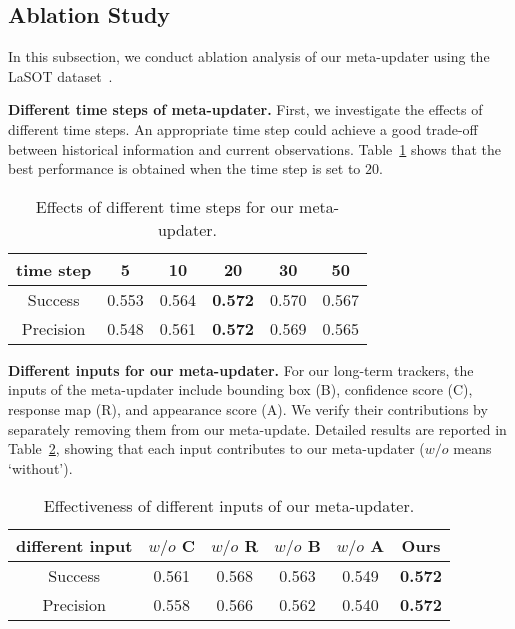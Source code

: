 \documentclass[10pt,twocolumn,letterpaper]{article}
\begin{document}
\subsection{Ablation Study}
\vspace{-2mm}
In this subsection, we conduct ablation analysis of our meta-updater
using the LaSOT dataset~\cite{LaSOT}.

\noindent \textbf{Different time steps of meta-updater.}
First, we investigate the effects of different time steps.
An appropriate time step could achieve a good trade-off between historical information and
current observations.
Table~\ref{tab:dts} shows that the best performance is obtained when the time step is set to
$20$.

\vspace{-3mm}
\begin{table}[h]
\caption{Effects of different time steps for our meta-updater.}
\vspace{-3mm}
\label{tab:dts}
\small
\begin{center}
\begin{tabular}{cccccc}
\hline
time step  & 5     & 10    & 20   & 30    & 50    \\
\hline
Success      & 0.553 & 0.564 & {\color[HTML]{FE0000} \textbf{0.572}} & 0.570 & 0.567 \\
Precision & 0.548 & 0.561 & {\color[HTML]{FE0000} \textbf{0.572}} & 0.569 & 0.565\\
\hline
\end{tabular}
\end{center}
\vspace{-6mm}
\end{table}

\noindent \textbf{Different inputs for our meta-updater.} For our long-term trackers, the inputs of
the meta-updater include bounding box (B), confidence score (C), response map (R), and appearance
score (A). We verify their contributions by separately removing them from our meta-update.
Detailed results are reported in Table~\ref{tab:updater_input}, showing that each input contributes
to our meta-updater ($w/o$ means `without').

\vspace{-2mm}
\begin{table}[h]
\caption{Effectiveness of different inputs of our meta-updater. }
\vspace{-5mm}
\small
\label{tab:updater_input}
\begin{center}
\begin{tabular}{cccccc}
\hline
different input & $w/o$ C    & $w/o$ R    & $w/o$ B  & $w/o$ A    & Ours                     \\
 \hline
Success         & 0.561 & 0.568 &0.563 & 0.549 & {\color[HTML]{FE0000} \textbf{0.572}} \\
Precision       & 0.558 & 0.566 &0.562 & 0.540 & {\color[HTML]{FE0000} \textbf{0.572}} \\
\hline
\end{tabular}
\end{center}
\vspace{-6mm}
\end{table}
\end{document}
